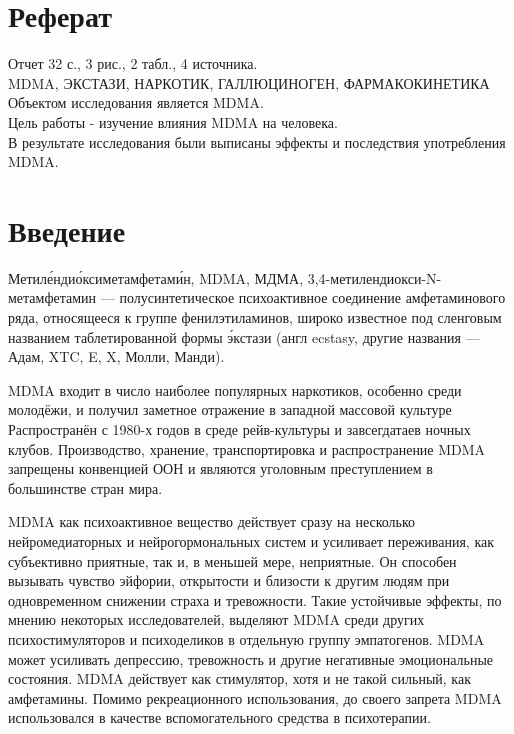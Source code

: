 \documentclass[a4paper,14pt,russian]{report}
\begin{document}


\newpage
{}
\setcounter{page}{2}

\section*{Реферат}

\noindent Отчет 32 с., 3 рис., 2 табл., 4 источника. \\
MDMA, ЭКСТАЗИ, НАРКОТИК, ГАЛЛЮЦИНОГЕН, ФАРМАКОКИНЕТИКА \\
Объектом исследования является MDMA. \\
Цель работы - изучение влияния MDMA на человека. \\
В результате исследования были выписаны эффекты и последствия употребления MDMA.

\tableofcontents

\section{Введение}

Метиле́ндио́ксиметамфетами́н, MDMA, МДМА, 3,4-метилендиокси-N-метамфетамин — полусинтетическое психоактивное соединение амфетаминового ряда, относящееся к группе фенилэтиламинов, широко известное под сленговым названием таблетированной формы э́кстази (англ ecstasy, другие названия — Адам, XTC, E, X, Молли, Манди).

MDMA входит в число наиболее популярных наркотиков, особенно среди молодёжи, и получил заметное отражение в западной массовой культуре Распространён с 1980-х годов в среде рейв-культуры и завсегдатаев ночных клубов. Производство, хранение, транспортировка и распространение MDMA запрещены конвенцией ООН и являются уголовным преступлением в большинстве стран мира.

MDMA как психоактивное вещество действует сразу на несколько нейромедиаторных и нейрогормональных систем и усиливает переживания, как субъективно приятные, так и, в меньшей мере, неприятные. Он способен вызывать чувство эйфории, открытости и близости к другим людям при одновременном снижении страха и тревожности. Такие устойчивые эффекты, по мнению некоторых исследователей, выделяют MDMA среди других психостимуляторов и психоделиков в отдельную группу эмпатогенов. MDMA может усиливать депрессию, тревожность и другие негативные эмоциональные состояния. MDMA действует как стимулятор, хотя и не такой сильный, как амфетамины. Помимо рекреационного использования, до своего запрета MDMA использовался в качестве вспомогательного средства в психотерапии.
\end{document}
